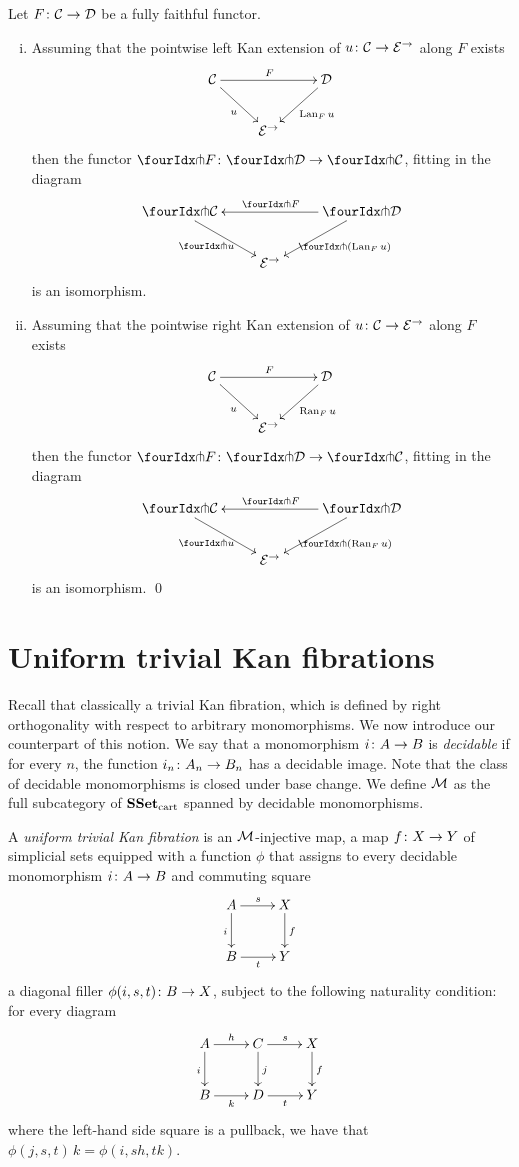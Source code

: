 \documentclass[reqno,10pt,a4paper,oneside]{amsart}
\begin{document}
\begin{proposition} Let $F \co \cal{C} \to \cal{D}$ be a fully faithful functor. 
\label{kan-extension-closure}
\begin{enumerate}[(i)]
\item Assuming that the pointwise left Kan extension of 
$u \co \cal{C} \to \catE^{\to}$ along $F$ exists
\[
\xymatrix{
  \cal{C}
  \ar[dr]_{u}
  \ar[rr]^{F}
&&
  \cal{D}
  \ar[dl]^{\Lan_F u}
\\&
  \catE^{\to}
}
\]
then the functor $\liftr{F} \co \liftr{\cal{D}} \to \liftr{\cal{C}}$,  fitting in the diagram
\[
\xymatrix{
  \liftr{\cal{C}}
  \ar[dr]_{\liftr{u}}
&&
  \liftr{\cal{D}}
  \ar[ll]_{\liftr{F}}
  \ar[dl]^{\liftr{(\Lan_F u)}}
\\&
  \catE^{\to}
}
\]
is an isomorphism.
\item Assuming that the pointwise right Kan extension of 
$u \co \cal{C} \to \catE^{\to}$ along $F$ exists
\[
\xymatrix{
  \cal{C}
  \ar[dr]_{u}
  \ar[rr]^{F}
&&
  \cal{D}
  \ar[dl]^{\Ran_F u}
\\&
  \catE^{\to}
}
\]
then the functor $\liftl{F} \co \liftl{\cal{D}} \to \liftl{\cal{C}}$, fitting in the diagram
\[
\xymatrix{
  \liftl{\cal{C}}
  \ar[dr]_{\liftl{u}}
&&
  \liftl{\cal{D}}
  \ar[ll]_{\liftl{F}}
  \ar[dl]^{\liftl{(\Ran_F u)}}
\\&
  \catE^{\to}
}
\]
is an isomorphism. \qed
\end{enumerate}
\end{proposition}








\section{Uniform trivial Kan fibrations}

Recall that classically a trivial Kan fibration, which is defined by right orthogonality with respect to arbitrary monomorphisms. We now introduce our counterpart of this notion. We say that a monomorphism 
$i \co A \to B$ is  \emph{decidable} if for every $n$, the function $i_n \co A_n \to B_n$ has a decidable image. 
Note that the class of decidable monomorphisms is closed under base change. We define $\cal{M}$ as the full subcategory of $\SSet_\cart$ spanned by decidable monomorphisms. 

\begin{definition} A \emph{uniform trivial Kan fibration}  is an $\cal{M}$-injective map,
\ie a map $f \co X \to Y$ of simplicial sets equipped with a function $\phi$
that assigns to every decidable monomorphism $i \co A \to B$ and commuting square 
 \[
 \xymatrix{
 A \ar[r]^s \ar[d]_i & X \ar[d]^f \\
 B \ar[r]_t & Y}
 \]
a diagonal filler $\phi(i, s, t) \co B \to X$, subject to the following naturality condition: for every 
diagram 
\[
\xymatrix{
A \ar[r]^{h} \ar[d]_{i} & C \ar[d]^{j}  \ar[r]^s & X \ar[d]^f \\
B \ar[r]_{k} & D \ar[r]_t & Y }
\]
where the left-hand side square is a pullback, we have that $\phi(j, s, t) \, k = \phi(i, s  h, t  k)$.
 \end{definition} 
 
\end{document}
